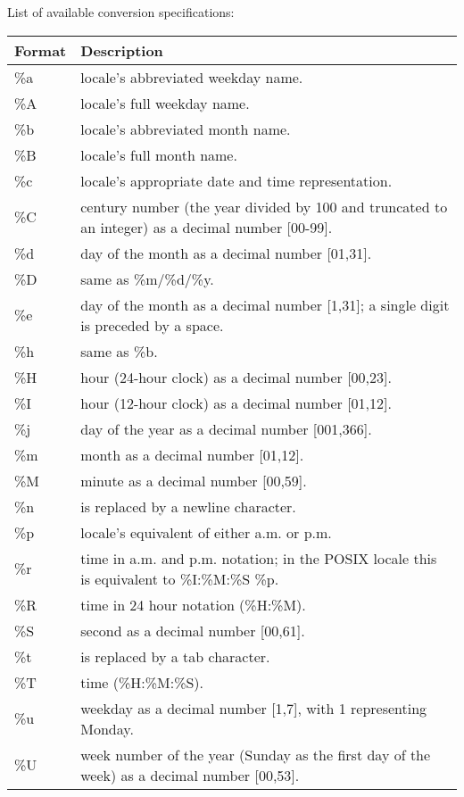 \newpage 
\noindent List of available conversion specifications:
\begin{center}
\begin{tabularx}{\linewidth}{lX}
\rowcolor{gray!30}\textbf{Format} & \textbf{Description} \\\hline
\%a & locale's abbreviated weekday name. \\
\%A & locale's full weekday name. \\
\%b & locale's abbreviated month name. \\
\%B & locale's full month name. \\
\%c & locale's appropriate date and time representation. \\
\%C & century number (the year divided by 100 and truncated to an integer) as a decimal number [00-99]. \\
\%d & day of the month as a decimal number [01,31]. \\
\%D & same as \%m/\%d/\%y. \\
\%e & day of the month as a decimal number [1,31]; a single digit is preceded by a space. \\
\%h & same as \%b. \\
\%H & hour (24-hour clock) as a decimal number [00,23]. \\
\%I & hour (12-hour clock) as a decimal number [01,12]. \\
\%j & day of the year as a decimal number [001,366]. \\
\%m & month as a decimal number [01,12]. \\
\%M & minute as a decimal number [00,59]. \\
\%n & is replaced by a newline character. \\
\%p & locale's equivalent of either a.m. or p.m. \\
\%r & time in a.m. and p.m. notation; in the POSIX locale this is equivalent to \%I:\%M:\%S \%p. \\
\%R & time in 24 hour notation (\%H:\%M). \\
\%S & second as a decimal number [00,61]. \\
\%t & is replaced by a tab character. \\
\%T & time (\%H:\%M:\%S). \\
\%u & weekday as a decimal number [1,7], with 1 representing Monday. \\
\%U & week number of the year (Sunday as the first day of the week) as a decimal number [00,53]. \\

\end{tabularx}
\end{center}
